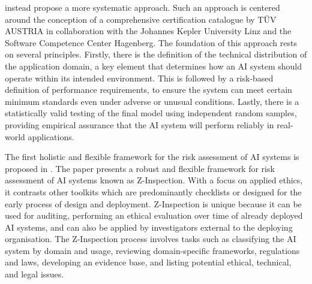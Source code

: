 \cite{winter_2021} instead propose a more systematic approach.
Such an approach is centered around the conception of a comprehensive certification catalogue by TÜV AUSTRIA in collaboration with the Johannes Kepler University Linz and the Software Competence Center Hagenberg.
The foundation of this approach rests on several principles. Firstly, there is the definition of the technical distribution of the application domain, a key element that determines how an AI system should operate within its intended environment. This is followed by a risk-based definition of performance requirements, to ensure the system can meet certain minimum standards even under adverse or unusual conditions. Lastly, there is a statistically valid testing of the final model using independent random samples, providing empirical assurance that the AI system will perform reliably in real-world applications.

The first holistic and flexible framework for the risk assessment of AI systems is proposed in \cite{zicari_2021}.
The paper presents a robust and flexible framework for risk assessment of AI systems known as Z-Inspection. With a focus on applied ethics, it contrasts other toolkits which are predominantly checklists or designed for the early process of design and deployment. Z-Inspection is unique because it can be used for auditing, performing an ethical evaluation over time of already deployed AI systems, and can also be applied by investigators external to the deploying organisation.
The Z-Inspection process involves tasks such as classifying the AI system by domain and usage, reviewing domain-specific frameworks, regulations and laws, developing an evidence base, and listing potential ethical, technical, and legal issues.

